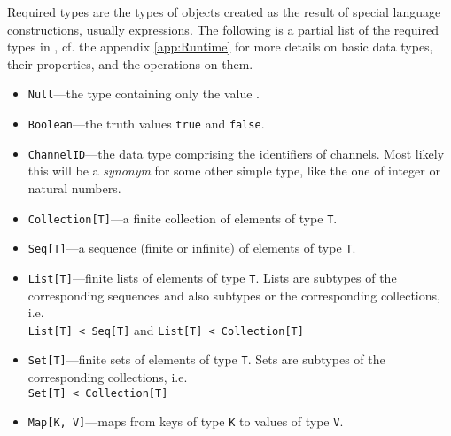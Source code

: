 Required types are the types of objects created as the result of
special language constructions, usually expressions. The following is
a partial list of the required types in \Cal, cf. the appendix
\ref{app:Runtime} for more details on basic data types, their
properties, and the operations on them.
\begin{itemize}

\item {\tt Null}---the type containing only the value \kwNull.

 
\item {\tt Boolean}---the truth values {\tt true} and {\tt false}.

\item {\tt ChannelID}---the data type comprising the identifiers of
  channels. Most likely this will be a {\em synonym} for some other simple
  type, like the one of integer or natural numbers.

\item {\tt Collection[T]}---a finite collection of elements of type
  {\tt T}.

\item {\tt Seq[T]}---a sequence (finite or infinite) of elements of
  type {\tt T}.

\item {\tt List[T]}---finite lists of elements of type {\tt T}. Lists are
  subtypes of the corresponding sequences and also subtypes or the
  corresponding collections, i.e.\\
  {\tt List[T] < Seq[T]} and {\tt List[T] < Collection[T]}

\item {\tt Set[T]}---finite sets of elements of type {\tt T}. Sets are
  subtypes of the corresponding collections, i.e.\\
  {\tt Set[T] < Collection[T]}

\item {\tt Map[K, V]}---maps from keys of type {\tt K} to values of type
    {\tt V}.



\end{itemize}

